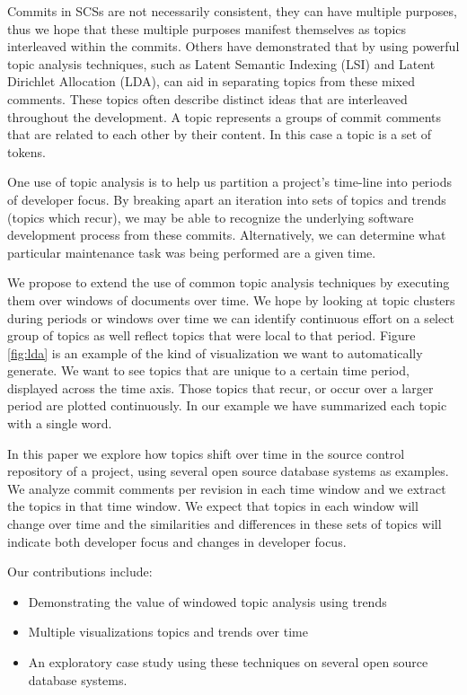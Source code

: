\documentclass[times, 10pt,twocolumn]{article}
\begin{document}
Commits in SCSs are not necessarily consistent, they can have multiple
purposes, thus we hope that these multiple purposes manifest themselves as
topics interleaved within the commits.   Others have demonstrated that by
using powerful topic analysis techniques, such as Latent Semantic Indexing
(LSI) and Latent Dirichlet Allocation (LDA), can aid in separating topics
from these mixed comments. These topics often describe distinct ideas
that are interleaved throughout the development. A topic represents a
groups of commit comments that are related to each other by their
content.  In this case a topic is a set of tokens.



One use of topic analysis is to help us partition a project's
time-line into periods of developer focus. By breaking apart an
iteration into sets of topics and trends (topics which recur), we may
be able to recognize the underlying software development process from
these commits. Alternatively, we can determine what particular
maintenance task was being performed are a given time.

We propose to extend the use of common topic analysis techniques by
executing them over windows of documents over time. We hope by looking
at topic clusters during periods or windows over time we can identify
continuous effort on a select group of topics as well reflect topics
that were local to that period. Figure \ref{fig:lda} is an example of
the kind of visualization we want to automatically generate. We want
to see topics that are unique to a certain time period, displayed
across the time axis. Those topics that recur, or occur over a
larger period are plotted continuously. In our example we have
summarized each topic with a single word.

In this paper we explore how topics shift over time in the source
control repository of a project, using several open source database
systems as examples. We analyze commit comments per revision in each
time window and we extract the topics in that time window. We expect
that topics in each window will change over time and the similarities
and differences in these sets of topics will indicate both developer
focus and changes in developer focus.

Our contributions include:
\begin{itemize}
\item Demonstrating the value of windowed topic analysis using trends
\item Multiple visualizations topics and trends over time
\item An exploratory case study using these techniques on several open source database systems.
\end{itemize}
\end{document}
